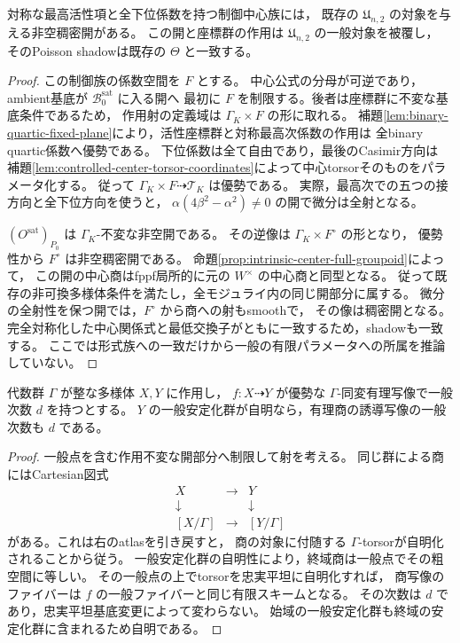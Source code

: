 \begin{corollary}[制御中心の共通開と全一般対象]
\label{cor:controlled-center-common-intrinsic-open}
対称な最高活性項と全下位係数を持つ制御中心族には，
既存の $\mathfrak U_{n,2}$ の対象を与える非空稠密開がある。
この開と座標群の作用は $\mathfrak U_{n,2}$ の一般対象を被覆し，
そのPoisson shadowは既存の $\Theta$ と一致する。
\end{corollary}
\begin{proof}
この制御族の係数空間を $F$ とする。
中心公式の分母が可逆であり，ambient基底が $\mathcal B_0^{\mathrm{sat}}$ に入る開へ
最初に $F$ を制限する。後者は座標群に不変な基底条件であるため，
作用射の定義域は $\Gamma_K\times F$ の形に取れる。
補題\ref{lem:binary-quartic-fixed-plane}により，活性座標群と対称最高次係数の作用は
全binary quartic係数へ優勢である。
下位係数は全て自由であり，最後のCasimir方向は
補題\ref{lem:controlled-center-torsor-coordinates}によって中心torsorそのものをパラメータ化する。
従って $\Gamma_K\times F\dashrightarrow\mathcal T_K$ は優勢である。
実際，最高次での五つの接方向と全下位方向を使うと，
$\alpha(4\beta^2-\alpha^2)\ne0$ の開で微分は全射となる。

$(O^{\mathrm{sat}})_{P_0}$ は $\Gamma_K$-不変な非空開である。
その逆像は $\Gamma_K\times F^\circ$ の形となり，
優勢性から $F^\circ$ は非空稠密開である。
命題\ref{prop:intrinsic-center-full-groupoid}によって，
この開の中心商はfppf局所的に元の $W^\times$ の中心商と同型となる。
従って既存の非可換多様体条件を満たし，全モジュライ内の同じ開部分に属する。
微分の全射性を保つ開では，$F^\circ$ から商への射もsmoothで，
その像は稠密開となる。
完全対称化した中心関係式と最低交換子がともに一致するため，shadowも一致する。
ここでは形式族への一致だけから一般の有限パラメータへの所属を推論していない。
\end{proof}

\begin{lemma}[一般自由な終域による商は次数を保つ]
\label{lem:generically-free-quotient-preserves-degree}
代数群 $\Gamma$ が整な多様体 $X,Y$ に作用し，
$f:X\dashrightarrow Y$ が優勢な $\Gamma$-同変有理写像で一般次数 $d$ を持つとする。
$Y$ の一般安定化群が自明なら，有理商の誘導写像の一般次数も $d$ である。
\end{lemma}
\begin{proof}
一般点を含む作用不変な開部分へ制限して射を考える。
同じ群による商にはCartesian図式
\[
 \begin{array}{ccc}
 X&\longrightarrow&Y\\
 \downarrow&&\downarrow\\
 {[X/\Gamma]}&\longrightarrow&[Y/\Gamma]
 \end{array}
\]
がある。これは右のatlasを引き戻すと，
商の対象に付随する $\Gamma$-torsorが自明化されることから従う。
一般安定化群の自明性により，終域商は一般点でその粗空間に等しい。
その一般点の上でtorsorを忠実平坦に自明化すれば，
商写像のファイバーは $f$ の一般ファイバーと同じ有限スキームとなる。
その次数は $d$ であり，忠実平坦基底変更によって変わらない。
始域の一般安定化群も終域の安定化群に含まれるため自明である。
\end{proof}


